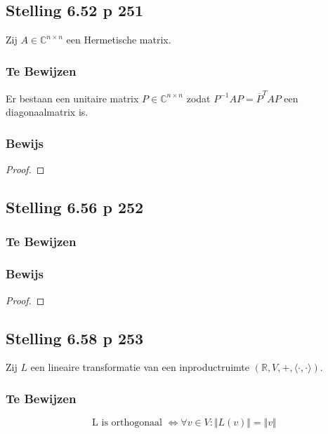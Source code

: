 \documentclass[lineaire_algebra_oplossingen.tex]{subfiles}
\begin{document}
\subsection{Stelling 6.52 p 251}
Zij $A \in \mathbb{C}^{n\times n}$ een Hermetische matrix.
\subsubsection*{Te Bewijzen}
Er bestaan een unitaire matrix $P \in \mathbb{C}^{n\times n}$ zodat $P^{-1}AP = \overline{P}^TAP$ een diagonaalmatrix is.
\subsubsection*{Bewijs}
\begin{proof}

\end{proof}

\subsection{Stelling 6.56 p 252}
\subsubsection*{Te Bewijzen}
\subsubsection*{Bewijs}
\begin{proof}

\end{proof}

\subsection{Stelling 6.58 p 253}
Zij $L$ een lineaire transformatie van een inproductruimte $(\mathbb{R},V,+,\langle \cdot,\cdot \rangle)$.
\subsubsection*{Te Bewijzen}
\[
\text{ L is orthogonaal } \Leftrightarrow \forall v \in V: \Vert L(v) \Vert = \Vert v\Vert
\]
\end{document}
